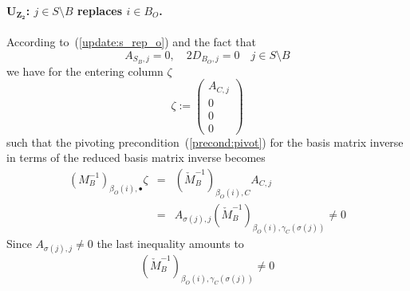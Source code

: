 \documentclass[a4paper]{article}
\begin{document}
\paragraph{$\mathbf{U_{Z_{2}}}$: $j \in S \setminus B$ replaces $i \in B_{O}$.}
According to~(\ref{update:s_rep_o}) and the fact that
\begin{equation}
A_{S_{B},j}=0, \quad 2D_{B_{O}, j}=0 \quad j \in S \setminus B
\end{equation}
we have for the entering column $\zeta$
\begin{equation}
\zeta:=
\left(
\begin{array}{c}
A_{C, j} \\
\hline
0 \\
\hline
0 \\
\hline
0
\end{array}
\right)
\end{equation}
such that the pivoting precondition~(\ref{precond:pivot})
for the basis matrix inverse in terms of
the reduced basis matrix inverse becomes
\begin{eqnarray}
\left(M_{B}^{-1}\right)_{\beta_{O}(i), \bullet} \zeta
&=&
\left(\check{M}_{B}^{-1}\right)_{\beta_{O}(i),C}A_{C,j}
\nonumber \\
&=&
A_{\sigma(j),j}
 \left(\check{M}_{B}^{-1}\right)_{\beta_{O}(i), \gamma_{C}(\sigma(j))} \neq 0
\nonumber
\end{eqnarray}
Since $A_{\sigma(j),j} \neq 0$ the last inequality amounts to
\begin{equation}
\left(\check{M}_{B}^{-1}\right)_{\beta_{O}(i), \gamma_{C}(\sigma(j))} \neq 0
\end{equation}
\end{document}
